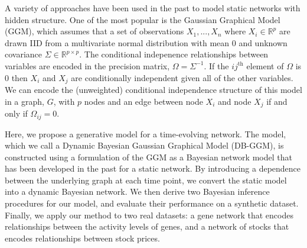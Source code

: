 \documentclass{article}
\begin{document}
A variety of approaches have been used in the past to model static networks with hidden structure. One of the most popular is the Gaussian Graphical Model (GGM), which assumes that a set of observations $X_1,...,X_n$ where $X_i \in \mathbb{R}^p$ are drawn IID from a multivariate normal distribution with mean $0$ and unknown covariance $\Sigma \in \mathbb{R}^{p \times p}$. The conditional indepenence relationships between variables are encoded in the precision matrix, $\Omega = \Sigma^{-1}$. If the ${ij}^{\text{th}}$ element of $\Omega$ is 0 then $X_i$ and $X_j$ are conditionally independent given all of the other variables. We can encode the (unweighted) conditional independence structure of this model in a graph, $G$, with $p$ nodes and an edge between node $X_i$ and node $X_j$ if and only if $\Omega_{ij} = 0$.



Here, we propose a generative model for a time-evolving network. The model, which we call a Dynamic Bayesian Gaussian Graphical Model (DB-GGM), is constructed using a formulation of the GGM as a Bayesian network model that has been developed in the past for a static network. By introducing a dependence between the underlying graph at each time point, we convert the static model into a dynamic Bayesian network. We then derive two Bayesian inference procedures for our model, and evaluate their performance on a synthetic dataset. Finally, we apply our method to two real datasets: a gene network that encodes relationships between the activity levels of genes, and a network of stocks that encodes relationships between stock prices.
\end{document}
